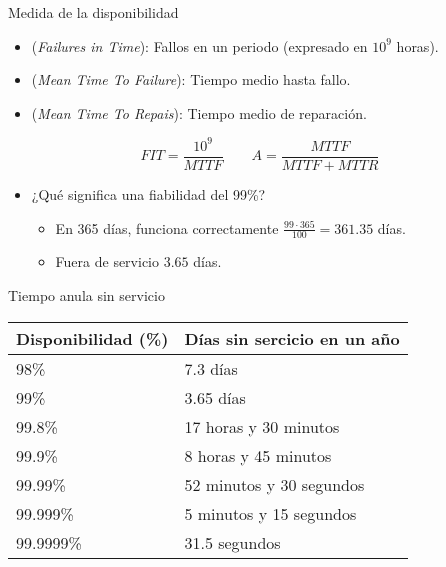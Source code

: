 \begin{frame}[t]{Medida de la disponibilidad}
\begin{itemize}
  \item {} (\emph{Failures in Time}): 
        Fallos en un periodo (expresado en $10^9$ horas).
  \item {} (\emph{Mean Time To Failure}):
        Tiempo medio hasta fallo.
  \item {} (\emph{Mean Time To Repais}):
        Tiempo medio de reparación.
\end{itemize}

\begin{equation*}
FIT = \frac{10^9}{MTTF}
\quad\quad 
A = \frac{MTTF}{MTTF + MTTR}
\end{equation*}

\begin{itemize}
  \item ¿Qué significa una fiabilidad del 99\%?
    \begin{itemize}
      \item En 365 días, funciona correctamente $\frac{99 \cdot 365}{100} = 361.35$ días.
      \item Fuera de servicio $3.65$ días.
    \end{itemize}
\end{itemize}
\end{frame}

\begin{frame}{Tiempo anula sin servicio}
\begin{center}
{\small
\begin{tabular}{|l|l|}
\hline
Disponibilidad (\%) & Días sin sercicio en un año\\
\hline
\hline
98\% & 7.3 días\\
\hline
99\% & 3.65 días\\
\hline
99.8\% & 17 horas y 30 minutos\\
\hline
99.9\% & 8 horas y 45 minutos\\
\hline
99.99\% & 52 minutos y 30 segundos\\
\hline
99.999\% & 5 minutos y 15 segundos\\
\hline
99.9999\% & 31.5 segundos\\
\hline
\end{tabular}
}
\end{center}
\end{frame}

